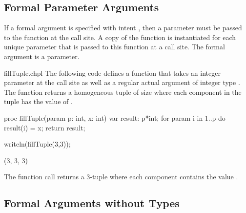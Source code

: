 \subsection{Formal Parameter Arguments}
\label{Formal_Parameter_Arguments}

If a formal argument is specified with intent , then a
parameter must be passed to the function at the call site.  A copy of
the function is instantiated for each unique parameter that is passed
to this function at a call site.  The formal argument is a parameter.
\begin{chapelexample}{fillTuple.chpl}
The following code defines a function that takes an integer parameter
 at the call site as well as a regular actual argument of
integer type .  The function returns a homogeneous tuple of
size  where each component in the tuple has the value of
.
\begin{chapel}
proc fillTuple(param p: int, x: int) {
  var result: p*int;
  for param i in 1..p do
    result(i) = x;
  return result;
}
\end{chapel}
\begin{chapelpost}
writeln(fillTuple(3,3));
\end{chapelpost}
\begin{chapeloutput}
(3, 3, 3)
\end{chapeloutput}
The function call  returns a 3-tuple where each
component contains the value .
\end{chapelexample}

\subsection{Formal Arguments without Types}
\label{Formal_Arguments_without_Types}

